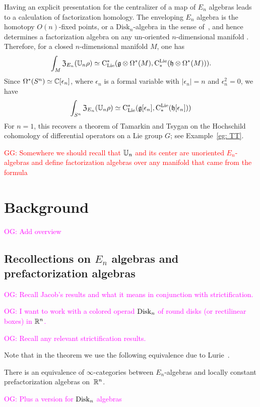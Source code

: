 \documentclass[11pt]{amsart}
\numberwithin{equation}{section}
\def\owen{\textcolor{magenta}{OG: }\textcolor{magenta}}
\def\greg{\textcolor{red}{GG: }\textcolor{red}}
\begin{document}
Having an explicit presentation for the centralizer of a map of $E_n$ algebras leads to a calculation of factorization homology.
The enveloping $E_n$ algebra is the homotopy $O(n)$-fixed points, or a $\mathrm{Disk}_n$-algebra in the sense of~\cite{AF},
and hence determines a factorization algebra on any un-oriented $n$-dimensional manifold \cite{Knudsen}.
Therefore, for a closed $n$-dimensional manifold $M$, one has
\[
\int_M {\frak Z}_{E_n}(\mathbb U_n \rho) \simeq {\rm C}_{\rm Lie}^*(\mathfrak g \otimes \Omega^*(M), {\rm C}^{\rm Lie}_*( \mathfrak h \otimes \Omega^*(M))).
\]
Since $\Omega^*(S^n) \simeq \mathbb C[\epsilon_n]$, where $\epsilon_n$ is a formal variable with $|\epsilon_n| = n$ and $\epsilon_n^2 = 0$, we have
\[
\int_{S^n} {\frak Z}_{E_n}(\mathbb U_n \rho) \simeq {\rm C}_{\rm Lie}^*(\mathfrak g[\epsilon_n], {\rm C}^{\rm Lie}_*( \mathfrak h[\epsilon_n]))
\]
For $n=1$, this recovers a theorem of Tamarkin and Tsygan \cite{TT} on the Hochschild cohomology of differential operators on a Lie group $G$;
see Example~\ref{eg: TT}. 

\greg{Somewhere we should recall that $\mathbb U_n$ and its center are unoriented $E_n$-algebras and define factorization algebras over any manifold that came from the formula}

\section{Background}

\owen{Add overview}

\subsection{Recollections on $E_n$ algebras and prefactorization algebras}
\label{sec: en background}

\owen{Recall Jacob's results and what it means in conjunction with strictification.}

\owen{I want to work with a colored operad ${\rm Disk}_n$ of round disks (or rectilinear boxes) in $\mathbb R^n$.}

\owen{Recall any relevant strictification results.}

Note that in the theorem we use the following equivalence due to Lurie~\cite{LurieHA}. 

\begin{thm}
\label{T:En=Fac} 
There is an equivalence of $\infty$-categories between $E_n$-algebras and locally constant prefactorization algebras on~$\mathbb R^n$. 
\end{thm}

\owen{Plus a version for ${\rm Disk}_n$ algebras}
\end{document}
